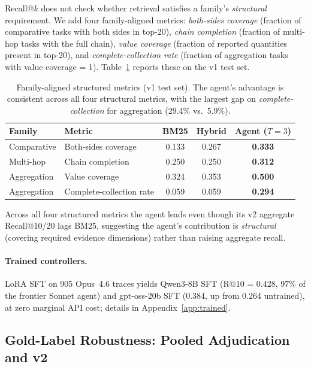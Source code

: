 \documentclass{article}
\begin{document}
Recall@$k$ does not check whether retrieval satisfies a family's \emph{structural} requirement. We add four family-aligned metrics: \emph{both-sides coverage} (fraction of comparative tasks with both sides in top-20), \emph{chain completion} (fraction of multi-hop tasks with the full chain), \emph{value coverage} (fraction of reported quantities present in top-20), and \emph{complete-collection rate} (fraction of aggregation tasks with value coverage = 1). Table~\ref{tab:familystruct} reports these on the v1 test set.

\begin{table}[t]
\centering
\caption{Family-aligned structured metrics (v1 test set). The agent's advantage is consistent across all four structural metrics, with the largest gap on \emph{complete-collection} for aggregation (29.4\% vs.\ 5.9\%).}
\label{tab:familystruct}
\small
\begin{tabular}{llccc}
\toprule
\textbf{Family} & \textbf{Metric} & \textbf{BM25} & \textbf{Hybrid} & \textbf{Agent ($T{=}3$)} \\
\midrule
Comparative  & Both-sides coverage      & 0.133 & 0.267 & \textbf{0.333} \\
Multi-hop    & Chain completion         & 0.250 & 0.250 & \textbf{0.312} \\
Aggregation  & Value coverage           & 0.324 & 0.353 & \textbf{0.500} \\
Aggregation  & Complete-collection rate & 0.059 & 0.059 & \textbf{0.294} \\
\bottomrule
\end{tabular}
\end{table}

Across all four structured metrics the agent leads even though its v2 aggregate Recall@10/20 lags BM25, suggesting the agent's contribution is \emph{structural} (covering required evidence dimensions) rather than raising aggregate recall.

\paragraph{Trained controllers.} LoRA SFT on 905 Opus~4.6 traces yields Qwen3-8B SFT (R@10 = 0.428, 97\% of the frontier Sonnet agent) and gpt-oss-20b SFT (0.384, up from 0.264 untrained), at zero marginal API cost; details in Appendix~\ref{app:trained}.

\subsection{Gold-Label Robustness: Pooled Adjudication and v2}
\label{sec:goldrobust}
\end{document}
